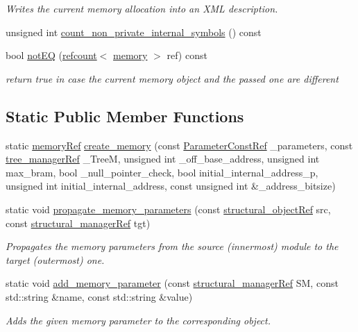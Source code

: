 \begin{DoxyCompactItemize}
\begin{DoxyCompactList}\small\item\em Writes the current memory allocation into an X\+ML description. \end{DoxyCompactList}\item 
unsigned int \hyperlink{classmemory_a65a07e87ed6884cc67998454ed50fb72}{count\+\_\+non\+\_\+private\+\_\+internal\+\_\+symbols} () const
\item 
bool \hyperlink{classmemory_a08892c0a65916344ca6b744256d764d7}{not\+EQ} (\hyperlink{structrefcount}{refcount}$<$ \hyperlink{classmemory}{memory} $>$ ref) const
\begin{DoxyCompactList}\small\item\em return true in case the current memory object and the passed one are different \end{DoxyCompactList}\end{DoxyCompactItemize}
\subsection*{Static Public Member Functions}
\begin{DoxyCompactItemize}
\item 
static \hyperlink{memory_8hpp_aec1333ec6cd561731fb3ed3e55b9caf5}{memory\+Ref} \hyperlink{classmemory_a169a0772cd5c322a06f7f433cb9c27af}{create\+\_\+memory} (const \hyperlink{Parameter_8hpp_a37841774a6fcb479b597fdf8955eb4ea}{Parameter\+Const\+Ref} \+\_\+parameters, const \hyperlink{tree__manager_8hpp_a96ff150c071ce11a9a7a1e40590f205e}{tree\+\_\+manager\+Ref} \+\_\+\+TreeM, unsigned int \+\_\+off\+\_\+base\+\_\+address, unsigned int max\+\_\+bram, bool \+\_\+null\+\_\+pointer\+\_\+check, bool initial\+\_\+internal\+\_\+address\+\_\+p, unsigned int initial\+\_\+internal\+\_\+address, const unsigned int \&\+\_\+address\+\_\+bitsize)
\item 
static void \hyperlink{classmemory_ad407ba2bf162ece359a8254a3d23db32}{propagate\+\_\+memory\+\_\+parameters} (const \hyperlink{structural__objects_8hpp_a8ea5f8cc50ab8f4c31e2751074ff60b2}{structural\+\_\+object\+Ref} src, const \hyperlink{structural__manager_8hpp_ab3136f0e785d8535f8d252a7b53db5b5}{structural\+\_\+manager\+Ref} tgt)
\begin{DoxyCompactList}\small\item\em Propagates the memory parameters from the source (innermost) module to the target (outermost) one. \end{DoxyCompactList}\item 
static void \hyperlink{classmemory_a8ed6105d60330239af187ab2d414d019}{add\+\_\+memory\+\_\+parameter} (const \hyperlink{structural__manager_8hpp_ab3136f0e785d8535f8d252a7b53db5b5}{structural\+\_\+manager\+Ref} SM, const std\+::string \&name, const std\+::string \&value)
\begin{DoxyCompactList}\small\item\em Adds the given memory parameter to the corresponding object. \end{DoxyCompactList}\end{DoxyCompactItemize}
